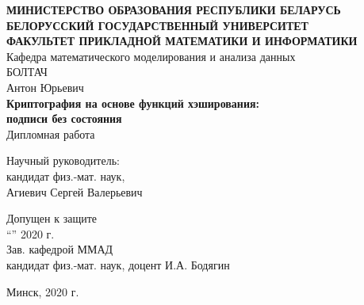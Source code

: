 \documentclass[a4paper, 14pt]{extarticle}
\begin{document}

\begin{center}
    \normalsize{\textbf{МИНИСТЕРСТВО ОБРАЗОВАНИЯ РЕСПУБЛИКИ БЕЛАРУСЬ}}\\
    \hfill \break
    \normalsize{\textbf{БЕЛОРУССКИЙ ГОСУДАРСТВЕННЫЙ УНИВЕРСИТЕТ}}\\
    \hfill \break
    \small{\textbf{ФАКУЛЬТЕТ ПРИКЛАДНОЙ МАТЕМАТИКИ И ИНФОРМАТИКИ}}\\
    \hfill \break
    \large{Кафедра математического моделирования и анализа данных}\\
    \vspace{40mm}
    \normalsize{БОЛТАЧ}\\
    \hfill \break
    \normalsize{Антон Юрьевич}\\
    \hfill \break
    \normalsize{\textbf{Криптография на основе функций хэширования:\\ подписи без состояния}}\\
    \hfill \break
    \normalsize{Дипломная работа}\\
    \hfill \break
\end{center}

\begin{flushright}
    \vspace{20mm}
    Научный руководитель:\\
    кандидат физ.-мат. наук,\\
    Агиевич Сергей Валерьевич\\
\end{flushright}

\begin{flushleft}
    \vspace{20mm}
    Допущен к защите\\
    “\underline{\hspace{8mm}}” \underline{\hspace{4cm}}2020 г.\\
    Зав. кафедрой ММАД\\
    кандидат физ.-мат. наук, доцент И.А. Бодягин\\
\end{flushleft}

\vfill
\begin{center}
    Минск, 2020 г.
\end{center}
\thispagestyle{empty} %
    
\end{document}
